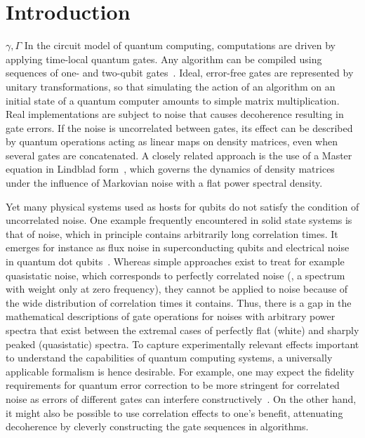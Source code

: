 \chapter{Introduction}\label{ch:ff:introduction}
$\gamma, \Gamma$
In the circuit model of quantum computing, computations are driven by applying time-local quantum gates.
Any algorithm can be compiled using sequences of one- and two-qubit gates~\cite{DiVincenzo1995}.
Ideal, error-free gates are represented by unitary transformations, so that simulating the action of an algorithm on an initial state of a quantum computer amounts to simple matrix multiplication.
Real implementations are subject to noise that causes decoherence resulting in gate errors.
If the noise is uncorrelated between gates, its effect can be described by quantum operations acting as linear maps on density matrices, even when several gates are concatenated.
A closely related approach is the use of a Master equation in Lindblad form~\cite{Lindblad1976}, which governs the dynamics of density matrices under the influence of Markovian noise with a flat power spectral density.

Yet many physical systems used as hosts for qubits do not satisfy the condition of uncorrelated noise.
One example frequently encountered in solid state systems is that of \oneoverf noise, which in principle contains arbitrarily long correlation times.
It emerges for instance as flux noise in superconducting qubits and electrical noise in quantum dot qubits~\cite{Brownnutt2015,Kumar2016,Yoneda2018,Paladino2014}.
Whereas simple approaches exist to treat for example quasistatic noise, which corresponds to perfectly correlated noise (\ie, a spectrum with weight only at zero frequency), they cannot be applied to \oneoverf noise because of the wide distribution of correlation times it contains.
Thus, there is a gap in the mathematical descriptions of gate operations for noises with arbitrary power spectra that exist between the extremal cases of perfectly flat (white) and sharply peaked (quasistatic) spectra.
To capture experimentally relevant effects important to understand the capabilities of quantum computing systems, a universally applicable formalism is hence desirable.
For example, one may expect the fidelity requirements for quantum error correction to be more stringent for correlated noise as errors of different gates can interfere constructively~\cite{Ng2009}.
On the other hand, it might also be possible to use correlation effects to one's benefit, attenuating decoherence by cleverly constructing the gate sequences in algorithms.

